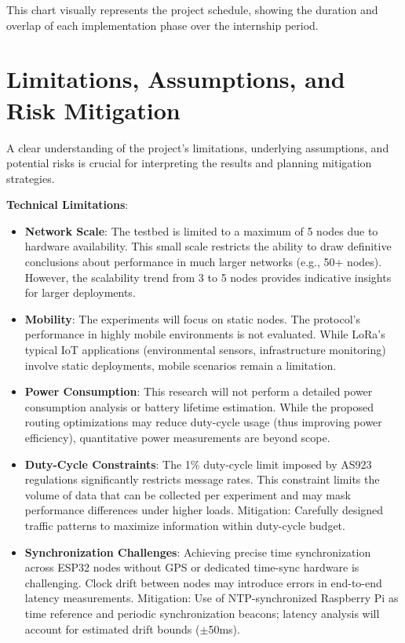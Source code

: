 This chart visually represents the project schedule, showing the duration and overlap of each implementation phase over the internship period.

\section{Limitations, Assumptions, and Risk Mitigation}

A clear understanding of the project's limitations, underlying assumptions, and potential risks is crucial for interpreting the results and planning mitigation strategies.

\textbf{Technical Limitations}:

\begin{itemize}
\item \textbf{Network Scale}: The testbed is limited to a maximum of 5 nodes due to hardware availability. This small scale restricts the ability to draw definitive conclusions about performance in much larger networks (e.g., 50+ nodes). However, the scalability trend from 3 to 5 nodes provides indicative insights for larger deployments.

\item \textbf{Mobility}: The experiments will focus on static nodes. The protocol's performance in highly mobile environments is not evaluated. While LoRa's typical IoT applications (environmental sensors, infrastructure monitoring) involve static deployments, mobile scenarios remain a limitation.

\item \textbf{Power Consumption}: This research will not perform a detailed power consumption analysis or battery lifetime estimation. While the proposed routing optimizations may reduce duty-cycle usage (thus improving power efficiency), quantitative power measurements are beyond scope.

\item \textbf{Duty-Cycle Constraints}: The 1\% duty-cycle limit imposed by AS923 regulations significantly restricts message rates. This constraint limits the volume of data that can be collected per experiment and may mask performance differences under higher loads. Mitigation: Carefully designed traffic patterns to maximize information within duty-cycle budget.

\item \textbf{Synchronization Challenges}: Achieving precise time synchronization across ESP32 nodes without GPS or dedicated time-sync hardware is challenging. Clock drift between nodes may introduce errors in end-to-end latency measurements. Mitigation: Use of NTP-synchronized Raspberry Pi as time reference and periodic synchronization beacons; latency analysis will account for estimated drift bounds ($\pm$50ms).
\end{itemize}

